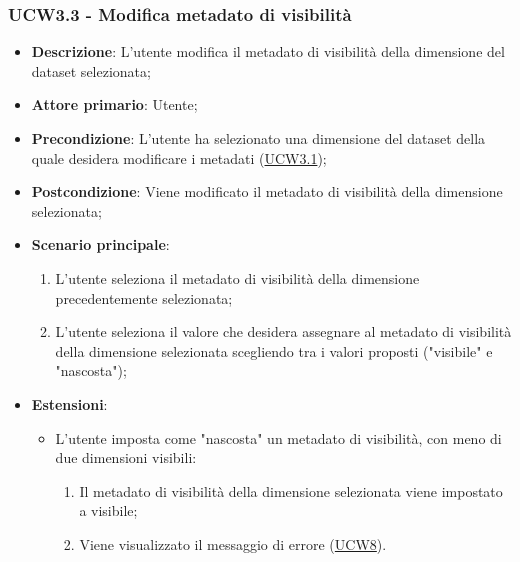 \subsubsection{UCW3.3 - Modifica metadato di visibilità}
\label{ssub:ucw3.3}

\begin{itemize}
    \item \textbf{Descrizione}: L’utente modifica il metadato di visibilità della dimensione del dataset selezionata;
	
    \item \textbf{Attore primario}: Utente;
    
    \item \textbf{Precondizione}:   L'utente ha selezionato una dimensione del dataset della quale desidera modificare 
    i metadati (\hyperref[ssub:ucw3.1]{UCW3.1});

    \item \textbf{Postcondizione}:  Viene modificato il metadato di visibilità della dimensione selezionata;

    \item \textbf{Scenario principale}: 
    \begin{enumerate}
        \item L'utente seleziona il metadato di visibilità della dimensione precedentemente selezionata;
        \item L'utente seleziona il valore che desidera assegnare al metadato di visibilità della dimensione 
        selezionata scegliendo tra i valori proposti ("visibile" e "nascosta");
    \end{enumerate}
    
    \item \textbf{Estensioni}:
    \begin{itemize}
        \item L'utente imposta come "nascosta" un metadato di visibilità, con meno di due dimensioni visibili:
        \begin{enumerate}
            \item Il metadato di visibilità della dimensione selezionata viene impostato a 
            visibile;
            \item Viene visualizzato il messaggio di errore (\hyperref[sub:ucw8]{UCW8}).
        \end{enumerate}
    \end{itemize}
\end{itemize}